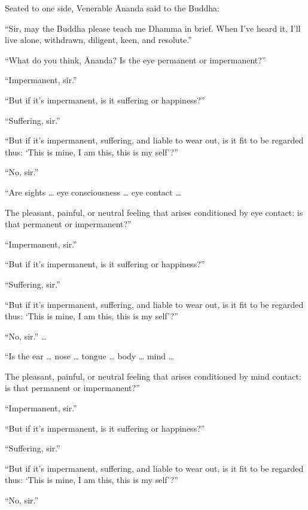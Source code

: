 \documentclass[12pt,openany]{book}%
\begin{document}
Seated to one side, Venerable Ānanda said to the Buddha: 

“Sir, may the Buddha please teach me Dhamma in brief. When I’ve heard it, I’ll live alone, withdrawn, diligent, keen, and resolute.” 

“What do you think, Ānanda? Is the eye permanent or impermanent?” 

“Impermanent, sir.” 

“But if it’s impermanent, is it suffering or happiness?” 

“Suffering, sir.” 

“But if it’s impermanent, suffering, and liable to wear out, is it fit to be regarded thus: ‘This is mine, I am this, this is my self’?” 

“No, sir.” 

“Are sights … eye consciousness … eye contact … 

The pleasant, painful, or neutral feeling that arises conditioned by eye contact: is that permanent or impermanent?” 

“Impermanent, sir.” 

“But if it’s impermanent, is it suffering or happiness?” 

“Suffering, sir.” 

“But if it’s impermanent, suffering, and liable to wear out, is it fit to be regarded thus: ‘This is mine, I am this, this is my self’?” 

“No, sir.” … 

“Is the ear … nose … tongue … body … mind … 

The pleasant, painful, or neutral feeling that arises conditioned by mind contact: is that permanent or impermanent?” 

“Impermanent, sir.” 

“But if it’s impermanent, is it suffering or happiness?” 

“Suffering, sir.” 

“But if it’s impermanent, suffering, and liable to wear out, is it fit to be regarded thus: ‘This is mine, I am this, this is my self’?” 

“No, sir.” 
\end{document}
